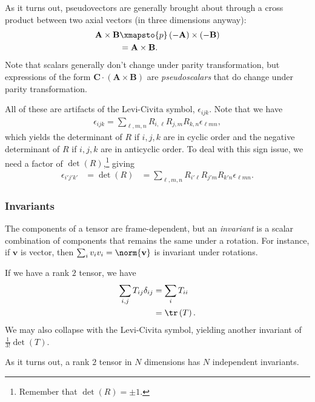 \documentclass[10pt]{mypackage}
\begin{document}
  As it turns out, pseudovectors are generally brought about through a cross product between two axial vectors (in three dimensions anyway):
  \begin{align*}
    \mathbf{A}\times \mathbf{B} &\xmapsto{p} \left( -\mathbf{A} \right)\times \left( -\mathbf{B} \right)\\
                                &= \mathbf{A}\times \mathbf{B}.
  \end{align*}
  Note that scalars generally don't change under parity transformation, but expressions of the form $\mathbf{C}\cdot \left( \mathbf{A}\times \mathbf{B} \right)$ are \textit{pseudoscalars} that do change under parity transformation.\newline

  All of these are artifacts of the Levi-Civita symbol, $\epsilon_{ijk}$. Note that we have
  \begin{align*}
    \epsilon_{ijk} = \sum_{\ell,m,n} R_{i,\ell}R_{j,m}R_{k,n}\epsilon_{\ell mn},
  \end{align*}
  which yields the determinant of $R$ if $i,j,k$ are in cyclic order and the negative determinant of $R$ if $i,j,k$ are in anticyclic order. To deal with this sign issue, we need a factor of $\det(R)$,\footnote{Remember that $\det(R) = \pm 1$.} giving
  \begin{align*}
    \epsilon_{i' j' k'} &= \det(R) &= \sum_{\ell,m,n} R_{i' \ell}R_{j' m}R_{k' n}\epsilon_{\ell m n}.
  \end{align*}
  \subsubsection{Invariants}%
  The components of a tensor are frame-dependent, but an \textit{invariant} is a scalar combination of components that remains the same under a rotation. For instance, if $\mathbf{v}$ is vector, then $\sum_{i} v_iv_i = \norm{\mathbf{v}}$ is invariant under rotations.\newline

  If we have a rank $2$ tensor, we have
  \begin{align*}
    \sum_{i,j} T_{ij}\delta_{ij} &= \sum_{i}T_{ii}\\
                                 &= \tr\left( T \right).
  \end{align*}
  We may also collapse with the Levi-Civita symbol, yielding another invariant of $\frac{1}{3!}\det\left( T \right)$.\newline

  As it turns out, a rank $2$ tensor in $N$ dimensions has $N$ independent invariants.\newline
\end{document}
